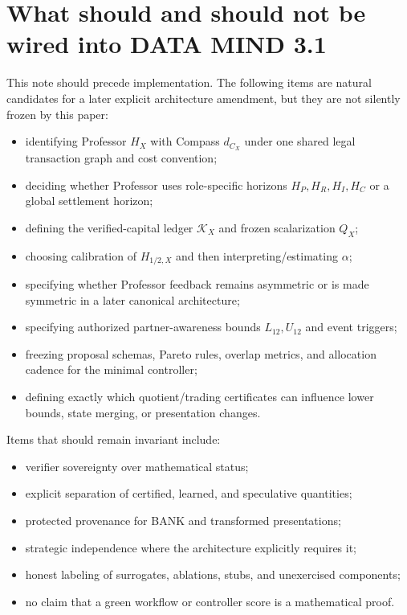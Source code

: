 \documentclass[11pt]{article}
\theoremstyle{definition}
\theoremstyle{remark}
\begin{document}
\section{What should and should not be wired into DATA MIND 3.1}

This note should precede implementation. The following items are natural candidates for a later explicit architecture amendment, but they are not silently frozen by this paper:
\begin{itemize}
\item identifying Professor $H_X$ with Compass $d_{C_X}$ under one shared legal transaction graph and cost convention;
\item deciding whether Professor uses role-specific horizons $H_P,H_R,H_I,H_C$ or a global settlement horizon;
\item defining the verified-capital ledger $\mathcal K_X$ and frozen scalarization $Q_X$;
\item choosing calibration of $H_{1/2,X}$ and then interpreting/estimating $\alpha$;
\item specifying whether Professor feedback remains asymmetric or is made symmetric in a later canonical architecture;
\item specifying authorized partner-awareness bounds $L_{12},U_{12}$ and event triggers;
\item freezing proposal schemas, Pareto rules, overlap metrics, and allocation cadence for the minimal controller;
\item defining exactly which quotient/trading certificates can influence lower bounds, state merging, or presentation changes.
\end{itemize}

Items that should remain invariant include:
\begin{itemize}
\item verifier sovereignty over mathematical status;
\item explicit separation of certified, learned, and speculative quantities;
\item protected provenance for BANK and transformed presentations;
\item strategic independence where the architecture explicitly requires it;
\item honest labeling of surrogates, ablations, stubs, and unexercised components;
\item no claim that a green workflow or controller score is a mathematical proof.
\end{itemize}
\end{document}

